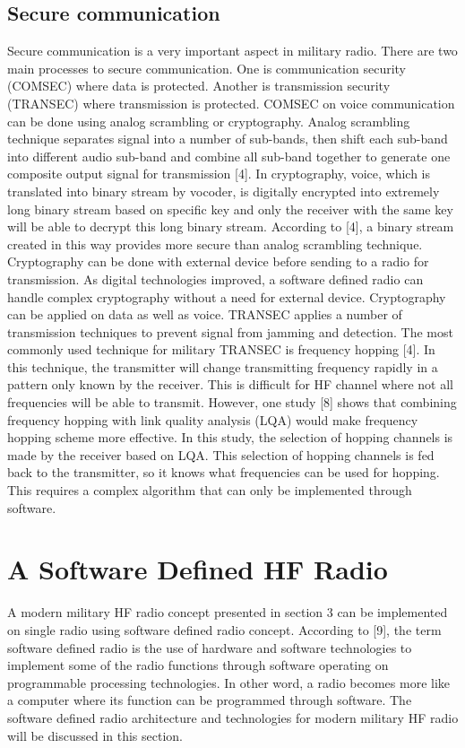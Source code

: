 \documentclass[conference]{IEEEtran}
\begin{document}
\subsection{Secure communication}
Secure communication is a very important aspect in military radio. There are two main processes to secure communication. One is communication security (COMSEC) where data is protected. Another is transmission security (TRANSEC) where transmission is protected. 
COMSEC on voice communication can be done using analog scrambling or cryptography. Analog scrambling technique separates signal into a number of sub-bands, then shift each sub-band into different audio sub-band and combine all sub-band together to generate one composite output signal for transmission [4].  In cryptography, voice, which is translated into binary stream by vocoder, is digitally encrypted into extremely long binary stream based on specific key and only the receiver with the same key will be able to decrypt this long binary stream. According to [4], a binary stream created in this way provides more secure than analog scrambling technique. Cryptography can be done with external device before sending to a radio for transmission. As digital technologies improved, a software defined radio can handle complex cryptography without a need for external device. Cryptography can be applied on data as well as voice.
TRANSEC applies a number of transmission techniques to prevent signal from jamming and detection. The most commonly used technique for military TRANSEC is frequency hopping [4]. In this technique, the transmitter will change transmitting frequency rapidly in a pattern only known by the receiver. This is difficult for HF channel where not all frequencies will be able to transmit. However, one study [8] shows that combining frequency hopping with link quality analysis (LQA) would make frequency hopping scheme more effective. In this study, the selection of hopping channels is made by the receiver based on LQA. This selection of hopping channels is fed back to the transmitter, so it knows what frequencies can be used for hopping. This requires a complex algorithm that can only be implemented through software.   
\section{A Software Defined HF Radio}
A modern military HF radio concept presented in section 3 can be implemented on single radio using software defined radio concept. According to [9], the term software defined radio is the use of hardware and software technologies to implement some of the radio functions through software operating on programmable processing technologies. In other word, a radio becomes more like a computer where its function can be programmed through software. The software defined radio architecture and technologies for modern military HF radio will be discussed in this section. 
\end{document}
